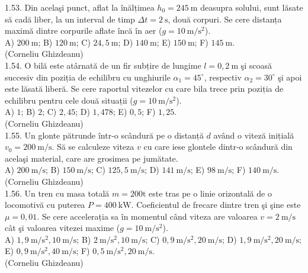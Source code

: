 1.53. Din acelaşi punct, aflat la înălțimea $h_{0}=245 \mathrm{~m}$ deasupra solului, sunt lăsate să cadă liber, la un interval de timp $\Delta t=2 \mathrm{~s}$, două corpuri. Se cere distanța maximă dintre corpurile aflate încă în aer ($g=10 \mathrm{~m} / \mathrm{s}^{2}$).\\ A) $200 \mathrm{~m}$; B) $120 \mathrm{~m}$; C) $24,5 \mathrm{~m}$; D) $140 \mathrm{~m}$; E) $150 \mathrm{~m}$; F) $145 \mathrm{~m}$.\\ (Corneliu Ghizdeanu)\\

1.54. O bilă este atârnată de un fir subțire de lungime $l=0,2 \mathrm{~m}$ şi scoasă succesiv din poziția de echilibru cu unghiurile $\alpha_{1}=45^{\circ}$, respectiv $\alpha_{2}=30^{\circ}$ şi apoi este lăsată liberă. Se cere raportul vitezelor cu care bila trece prin poziția de echilibru pentru cele două situații ($g=10 \mathrm{~m} / \mathrm{s}^{2}$).\\ A) $1$; B) $2$; C) $2,45$; D) $1,478$; E) $0,5$; F) $1,25$.\\ (Corneliu Ghizdeanu)\\

1.55. Un glonte pătrunde într-o scândură pe o distanță $d$ având o viteză inițială $v_{0}=200 \mathrm{~m} / \mathrm{s}$. Să se calculeze viteza $v$ cu care iese glontele dintr-o scândură din acelaşi material, care are grosimea pe jumătate.\\ A) $200 \mathrm{~m} / \mathrm{s}$; B) $150 \mathrm{~m} / \mathrm{s}$; C) $125,5 \mathrm{~m} / \mathrm{s}$; D) $141 \mathrm{~m} / \mathrm{s}$; E) $98 \mathrm{~m} / \mathrm{s}$; F) $140 \mathrm{~m} / \mathrm{s}$.\\ (Corneliu Ghizdeanu)\\

1.56. Un tren cu masa totală $m=200 \mathrm{t}$ este tras pe o linie orizontală de o locomotivă cu puterea $P=400 \mathrm{~kW}$. Coeficientul de frecare dintre tren şi şine este $\mu=0,01$. Se cere accelerația sa în momentul când viteza are valoarea $v=2 \mathrm{~m} / \mathrm{s}$ cât şi valoarea vitezei maxime ($g=10 \mathrm{~m} / \mathrm{s}^{2}$).\\ A) $1,9 \mathrm{~m} / \mathrm{s}^{2}, 10 \mathrm{~m} / \mathrm{s}$; B) $2 \mathrm{~m} / \mathrm{s}^{2}, 10 \mathrm{~m} / \mathrm{s}$; C) $0,9 \mathrm{~m} / \mathrm{s}^{2}, 20 \mathrm{~m} / \mathrm{s}$; D) $1,9 \mathrm{~m} / \mathrm{s}^{2}, 20 \mathrm{~m} / \mathrm{s}$; E) $0,9 \mathrm{~m} / \mathrm{s}^{2}, 40 \mathrm{~m} / \mathrm{s}$; F) $0,5 \mathrm{~m} / \mathrm{s}^{2}, 20 \mathrm{~m} / \mathrm{s}$.\\ (Corneliu Ghizdeanu)\\

